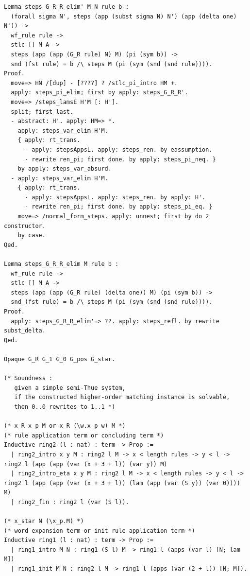 \documentclass[10pt,a4paper]{amsart}
\begin{document}
\begin{lstlisting}
Lemma steps_G_R_R_elim' M N rule b :
  (forall sigma N', steps (app (subst sigma N) N') (app (delta one) N')) ->
  wf_rule rule ->
  stlc [] M A ->
  steps (app (app (G_R rule) N) M) (pi (sym b)) ->
  snd (fst rule) = b /\ steps M (pi (sym (snd (snd rule)))).
Proof.
  move=> HN /[dup] - [????] ? /stlc_pi_intro HM +.
  apply: steps_pi_elim; first by apply: steps_G_R_R'.
  move=> /steps_lamsE H'M [: H'].
  split; first last.
  - abstract: H'. apply: HM=> *.
    apply: steps_var_elim H'M.
    { apply: rt_trans.
      - apply: stepsAppsL. apply: steps_ren. by eassumption.
      - rewrite ren_pi; first done. by apply: steps_pi_neq. }
    by apply: steps_var_absurd.
  - apply: steps_var_elim H'M.
    { apply: rt_trans.
      - apply: stepsAppsL. apply: steps_ren. by apply: H'.
      - rewrite ren_pi; first done. by apply: steps_pi_eq. }
    move=> /normal_form_steps. apply: unnest; first by do 2 constructor.
    by case.
Qed.

Lemma steps_G_R_R_elim M rule b :
  wf_rule rule ->
  stlc [] M A ->
  steps (app (app (G_R rule) (delta one)) M) (pi (sym b)) ->
  snd (fst rule) = b /\ steps M (pi (sym (snd (snd rule)))).
Proof.
  apply: steps_G_R_R_elim'=> ??. apply: steps_refl. by rewrite subst_delta.
Qed.

Opaque G_R G_1 G_0 G_pos G_star.

(* Soundness :
   given a simple semi-Thue system,
   if the constructed higher-order matching instance is solvable,
   then 0..0 rewrites to 1..1 *)

(* x_R x_p M or x_R (\w.x_p w) M *)
(* rule application term or concluding term *)
Inductive ring2 (l : nat) : term -> Prop :=
  | ring2_intro x y M : ring2 l M -> x < length rules -> y < l -> ring2 l (app (app (var (x + 3 + l)) (var y)) M)
  | ring2_intro_eta x y M : ring2 l M -> x < length rules -> y < l -> ring2 l (app (app (var (x + 3 + l)) (lam (app (var (S y)) (var 0)))) M)
  | ring2_fin : ring2 l (var (S l)).

(* x_star N (\x_p.M) *)
(* word expansion term or init rule application term *)
Inductive ring1 (l : nat) : term -> Prop :=
  | ring1_intro M N : ring1 (S l) M -> ring1 l (apps (var l) [N; lam M])
  | ring1_init M N : ring2 l M -> ring1 l (apps (var (2 + l)) [N; M]).


\end{lstlisting}
\end{document}
